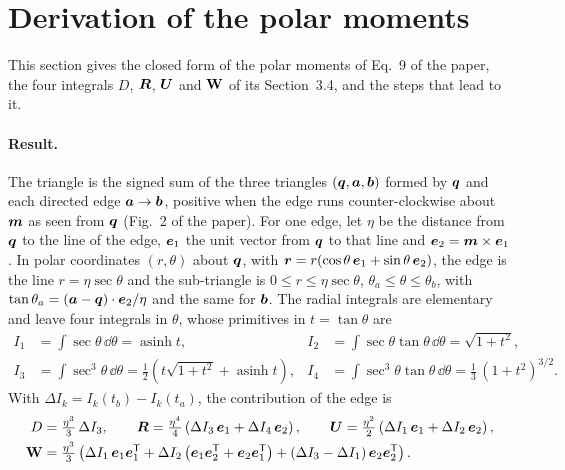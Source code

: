 \section{Derivation of the polar moments}\label{sup:polar}

This section gives the closed form of the polar moments of Eq.~9 of the paper, the four
integrals $D$, $\boldsymbol{R}$, $\boldsymbol{U}$ and $\mathbf{W}$ of its Section~3.4, and the steps that lead
to it.

\paragraph{Result.} The triangle is the signed sum of the three triangles
$(\boldsymbol{q}, \boldsymbol{a}, \boldsymbol{b})$ formed by $\boldsymbol{q}$ and each directed edge $\boldsymbol{a}\to\boldsymbol{b}$, positive
when the edge runs counter-clockwise about $\boldsymbol{m}$ as seen from $\boldsymbol{q}$ (Fig.~2 of the paper). For one
edge, let $\eta$ be the distance from $\boldsymbol{q}$ to the line of the edge, $\boldsymbol{e}_1$ the unit vector
from $\boldsymbol{q}$ to that line and $\boldsymbol{e}_2 = \boldsymbol{m}\times\boldsymbol{e}_1$. In polar coordinates
$(r, \theta)$ about $\boldsymbol{q}$, with $\boldsymbol{r} = r(\cos\theta\,\boldsymbol{e}_1 + \sin\theta\,\boldsymbol{e}_2)$, the
edge is the line $r = \eta\sec\theta$ and the sub-triangle is $0\le r\le \eta\sec\theta$,
$\theta_a\le\theta\le\theta_b$, with $\tan\theta_a = (\boldsymbol{a}-\boldsymbol{q})\cdot\boldsymbol{e}_2/\eta$ and the
same for $\boldsymbol{b}$. The radial integrals are elementary and leave four integrals in $\theta$,
whose primitives in $t = \tan\theta$ are
\begin{equation}
\begin{aligned}
  I_1 &= \int\sec\theta\,\dd\theta = \operatorname{asinh} t, &
  I_2 &= \int\sec\theta\tan\theta\,\dd\theta = \sqrt{1+t^2},\\
  I_3 &= \int\sec^3\theta\,\dd\theta = \tfrac12\left(t\sqrt{1+t^2} + \operatorname{asinh} t\right), &
  I_4 &= \int\sec^3\theta\tan\theta\,\dd\theta = \tfrac13\,(1+t^2)^{3/2} .
\end{aligned}
\label{eq:primitives}
\end{equation}
With $\Delta I_k = I_k(t_b) - I_k(t_a)$, the contribution of the edge is
\begin{equation}
\begin{aligned}
  D &= \tfrac{\eta^3}{3}\,\Delta I_3, \qquad
  \boldsymbol{R} = \tfrac{\eta^4}{4}\left(\Delta I_3\,\boldsymbol{e}_1 + \Delta I_4\,\boldsymbol{e}_2\right), \qquad
  \boldsymbol{U} = \tfrac{\eta^2}{2}\left(\Delta I_1\,\boldsymbol{e}_1 + \Delta I_2\,\boldsymbol{e}_2\right),\\
  \mathbf{W} &= \tfrac{\eta^3}{3}\left(\Delta I_1\,\boldsymbol{e}_1\boldsymbol{e}_1^{\mathsf T}
     + \Delta I_2\left(\boldsymbol{e}_1\boldsymbol{e}_2^{\mathsf T} + \boldsymbol{e}_2\boldsymbol{e}_1^{\mathsf T}\right)
     + (\Delta I_3 - \Delta I_1)\,\boldsymbol{e}_2\boldsymbol{e}_2^{\mathsf T}\right).
\end{aligned}
\label{eq:edge}
\end{equation}
